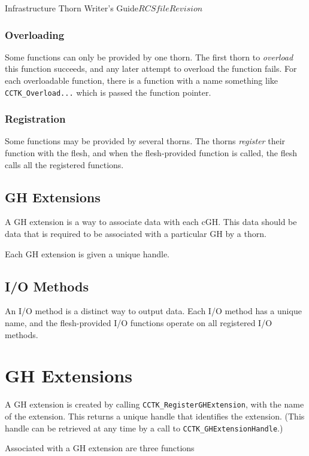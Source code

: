 \begin{cactuspart}{Infrastructure Thorn Writer's Guide}{$RCSfile$}{$Revision$}
\subsection{Overloading}

Some functions can only be provided by one thorn.  The first thorn to
\textit{overload} this function succeeds, and any later attempt to overload
the function fails.  For each overloadable function, there is a function
with a name something like {\tt CCTK\_Overload...} which is passed the
function pointer.

\subsection{Registration}

Some functions may be provided by several thorns.  The thorns \textit{register}
their function with the flesh, and when the flesh-provided function is called,
the flesh calls all the registered functions.

\section{GH Extensions}

A GH extension is a way to associate data with each cGH.  This data should be data
that is required to be associated with a particular GH by a thorn.

Each GH extension is given a unique handle.

\section{I/O Methods}

An I/O method is a distinct way to output data.  Each I/O method has a unique name,
and the flesh-provided I/O functions operate on all registered I/O methods.

\chapter{GH Extensions}

A GH extension is created by calling {\tt CCTK\_RegisterGHExtension}, with the
name of the extension.  This returns a unique handle that identifies the extension.
(This handle can be retrieved at any time by a call to {\tt CCTK\_GHExtensionHandle}.)

Associated with a GH extension are three functions


\end{cactuspart}
